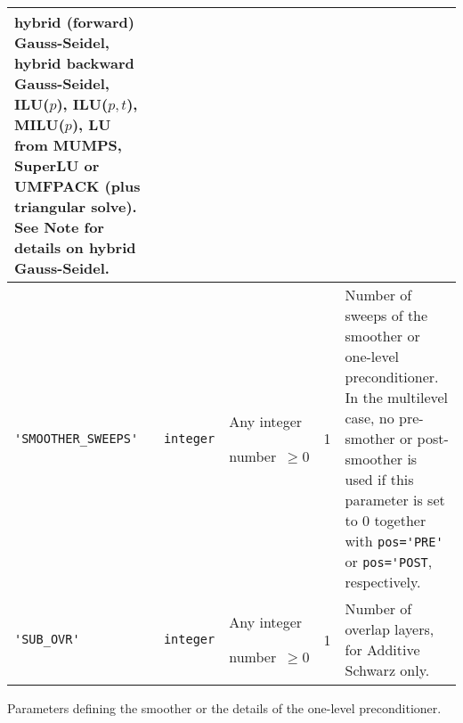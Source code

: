 \begin{center}
\begin{tabular}{|p{3.6cm}|l|p{1.9cm}|p{3.6cm}|p{6.5cm}|}
                            hybrid (forward) Gauss-Seidel, hybrid backward
                           Gauss-Seidel, ILU($p$),  ILU($p,t$), MILU($p$),
                           LU from MUMPS, SuperLU or UMFPACK
                           (plus triangular solve). See Note for details on hybrid
                           Gauss-Seidel. \\ \hline
\verb|'SMOOTHER_SWEEPS'|  & \verb|integer|
                         & Any integer \par number~$\ge 0$
                         & 1
                         & Number of sweeps of the smoother or one-level preconditioner.
                            In the multilevel case, no pre-smother or
                            post-smoother is used if this parameter is set to 0 
                            together with \verb|pos='PRE'| or \verb|pos='POST|,
                           respectively. \\ \hline
\verb|'SUB_OVR'|  & \verb|integer|
                         & Any integer \par number~$\ge 0$
                         & 1
                         & Number of overlap layers, for Additive Schwarz only. \\
\hline
\end{tabular}
\end{center}
\caption{Parameters defining the smoother or the details of the one-level preconditioner.
\label{tab:p_smoother}}  
\esideways

